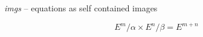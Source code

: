 \documentclass{imgs}
\begin{document}
\textit{imgs} -- equations as self contained images

\[
  E^m / \alpha \times E^n / \beta = E^{m + n}
\]
\end{document}
